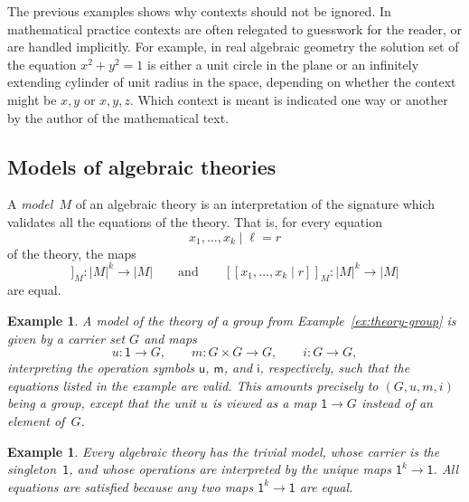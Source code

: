 \documentclass{amsart}
\newcommand{\one}{\mathsf{1}}
\newcommand{\sem}[1]{[\![#1]\!]}
\newtheorem{example}[definition]{Example}
\begin{document}
The previous examples shows why contexts should not be ignored. In mathematical practice
contexts are often relegated to guesswork for the reader, or are handled implicitly. For
example, in real algebraic geometry the solution set of the equation $x^2 + y^2 = 1$ is
either a unit circle in the plane or an infinitely extending cylinder of unit radius in
the space, depending on whether the context might be $x, y$ or $x, y, z$. Which context is
meant is indicated one way or another by the author of the mathematical text.

\subsection{Models of algebraic theories}
\label{sec:models-algebr-theor}

A \emph{model~$M$} of an algebraic theory is an interpretation of the signature which
validates all the equations of the theory. That is, for every equation
%
\begin{equation*}
  x_1, \ldots, x_k \mid \ell = r
\end{equation*}
%
of the theory, the maps
%
\begin{equation*}
  \sem{x_1, \ldots, x_k \mid \ell}_M : |M|^k \to |M|
  \qquad\text{and}\qquad
  \sem{x_1, \ldots, x_k \mid r}_M : |M|^k \to |M|
\end{equation*}
%
are equal.

\begin{example}
  A model of the theory of a group from Example~\ref{ex:theory-group} is given by a
  carrier set $G$ and maps
  \begin{equation*}
    u : \one \to G,\qquad
    m : G \times G \to G,\qquad
    i : G \to G,
  \end{equation*}
  interpreting the operation symbols $\mathsf{u}$, $\mathsf{m}$, and $\mathsf{i}$,
  respectively, such that the equations listed in the example are valid. This amounts
  precisely to $(G, u, m, i)$ being a group, except that the unit $u$ is viewed as a map
  $\one \to G$ instead of an element of~$G$.
\end{example}

\begin{example}
  Every algebraic theory has the \emph{trivial model}, whose carrier is the
  singleton~$\one$, and whose operations are interpreted by the unique maps
  $\one^k \to \one$. All equations are satisfied because any two maps $\one^k \to \one$
  are equal.
\end{example}
\end{document}
